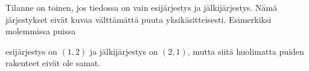 Tilanne on toinen, jos tiedossa on vain
esijärjestys ja jälkijärjestys.
Nämä järjestykset eivät
kuvaa välttämättä puuta yksikäsitteisesti.
Esimerkiksi molemmissa puissa
\begin{center}
\end{center}
esijärjestys on $(1,2)$ ja jälkijärjestys on $(2,1)$,
mutta siitä huolimatta puiden rakenteet eivät ole samat.

